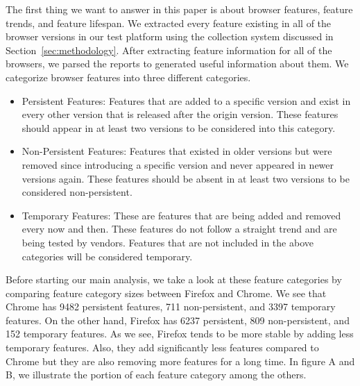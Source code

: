 The first thing we want to answer in this paper is about browser features, feature trends, and feature lifespan. We extracted every feature existing in all of the browser versions in our test platform using the collection system discussed in Section~\ref{sec:methodology}. After extracting feature information for all of the browsers, we parsed the reports to generated useful information about them. We categorize browser features into three different categories.

\begin{itemize}
    \item Persistent Features: Features that are added to a specific version and exist in every other version that is released after the origin version. These features should appear in at least two versions to be considered into this category.
    \item Non-Persistent Features: Features that existed in older versions but were removed since introducing a specific version and never appeared in newer versions again. These features should be absent in at least two versions to be considered non-persistent.
    \item Temporary Features: These are features that are being added and removed every now and then. These features do not follow a straight trend and are being tested by vendors. Features that are not included in the above categories will be considered temporary.
\end{itemize}

Before starting our main analysis, we take a look at these feature categories by comparing feature category sizes between Firefox and Chrome. We see that Chrome has 9482 persistent features, 711 non-persistent, and 3397 temporary features. On the other hand, Firefox has 6237 persistent, 809 non-persistent, and 152 temporary features. As we see, Firefox tends to be more stable by adding less temporary features. Also, they add significantly less features compared to Chrome but they are also removing more features for a long time. In figure A and B, we illustrate the portion of each feature category among the others.


